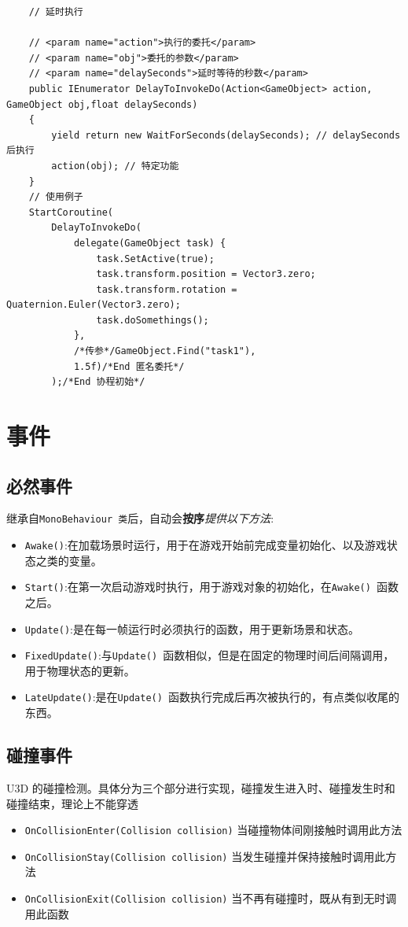 \documentclass[UTF8,a4paper,12pt]{ctexbook}
\begin{document}
		\begin{lstlisting}
	// 延时执行

	// <param name="action">执行的委托</param>
	// <param name="obj">委托的参数</param>
	// <param name="delaySeconds">延时等待的秒数</param>
	public IEnumerator DelayToInvokeDo(Action<GameObject> action, GameObject obj,float delaySeconds)
	{
		yield return new WaitForSeconds(delaySeconds); // delaySeconds 后执行
		action(obj); // 特定功能
	}
	// 使用例子
	StartCoroutine(
		DelayToInvokeDo(
			delegate(GameObject task) {
				task.SetActive(true);
				task.transform.position = Vector3.zero;
				task.transform.rotation = Quaternion.Euler(Vector3.zero);
				task.doSomethings();
			},
			/*传参*/GameObject.Find("task1"),
			1.5f)/*End 匿名委托*/
		);/*End 协程初始*/
		\end{lstlisting}
		
\chapter{事件}
	\section{必然事件}
		继承自\verb|MonoBehaviour 类|后，自动会\textbf{按序}\textit{提供以下方法}:
		
		\begin{itemize}
			\item \verb|Awake()|:在加载场景时运行，用于在游戏开始前完成变量初始化、以及游戏状态之类的变量。
			\item \verb|Start()|:在第一次启动游戏时执行，用于游戏对象的初始化，在\verb|Awake() |函数之后。
			\item \verb|Update()|:是在每一帧运行时必须执行的函数，用于更新场景和状态。
			\item \verb|FixedUpdate()|:与\verb|Update() |函数相似，但是在固定的物理时间后间隔调用，用于物理状态的更新。
			\item \verb|LateUpdate()|:是在\verb|Update() |函数执行完成后再次被执行的，有点类似收尾的东西。 
		\end{itemize}
			
	\section{碰撞事件}
		U3D 的碰撞检测。具体分为三个部分进行实现，碰撞发生进入时、碰撞发生时和碰撞结束，理论上不能穿透
		
		\begin{itemize}
			\item \verb|OnCollisionEnter(Collision collision)| 当碰撞物体间刚接触时调用此方法
			\item \verb|OnCollisionStay(Collision collision)| 当发生碰撞并保持接触时调用此方法
			\item \verb|OnCollisionExit(Collision collision)| 当不再有碰撞时，既从有到无时调用此函数
		\end{itemize}
\end{document}
